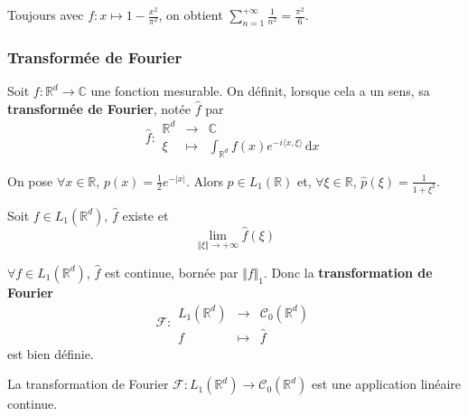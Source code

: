 	\begin{example}
		Toujours avec $f : x \mapsto 1 - \frac{x^2}{\pi^2}$, on obtient $\sum_{n=1}^{+\infty} \frac{1}{n^2} = \frac{\pi^2}{6}$.
	\end{example}

	\subsubsection{Transformée de Fourier}


	\begin{definition}
		Soit $f : \mathbb{R}^d \rightarrow \mathbb{C}$ une fonction mesurable. On définit, lorsque cela a un sens, sa \textbf{transformée de Fourier}, notée $\widehat{f}$ par
		\[
		\widehat{f} :
		\begin{array}{ccc}
			\mathbb{R}^d &\rightarrow& \mathbb{C} \\
			\xi &\mapsto& \int_{\mathbb{R}^d} f(x) e^{-i \langle x, \xi \rangle} \, \mathrm{d}x
		\end{array}
		\]
	\end{definition}

	\begin{example}
		On pose $\forall x \in \mathbb{R}$, $p(x) = \frac{1}{2} e^{-|x|}$. Alors $p \in L_1(\mathbb{R})$ et, $\forall \xi \in \mathbb{R}$, $\widehat{p}(\xi) = \frac{1}{1+\xi^2}$.
	\end{example}

	\begin{lemma}
		Soit $f \in L_1(\mathbb{R}^d)$, $\widehat{f}$ existe et
		\[ \lim_{\Vert \xi \Vert \rightarrow +\infty} \widehat{f}(\xi) \]
	\end{lemma}

	\begin{theorem}
		$\forall f \in L_1(\mathbb{R}^d)$, $\widehat{f}$ est continue, bornée par $\Vert f \Vert_1$. Donc la \textbf{transformation de Fourier}
		\[
		\mathcal{F} :
		\begin{array}{ccc}
			L_1(\mathbb{R}^d) &\rightarrow& \mathcal{C}_0(\mathbb{R}^d) \\
			f &\mapsto& \widehat{f}
		\end{array}
		\]
		est bien définie.
	\end{theorem}

	\begin{corollary}
		La transformation de Fourier $\mathcal{F} : L_1(\mathbb{R}^d) \rightarrow \mathcal{C}_0(\mathbb{R}^d)$ est une application linéaire continue.
	\end{corollary}

